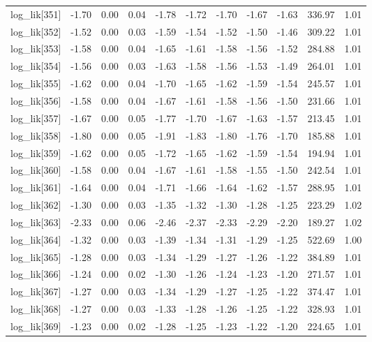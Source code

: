 \begin{table}[ht]
\begin{tabular}{rrrrrrrrrrr}
  log\_lik[351] & -1.70 & 0.00 & 0.04 & -1.78 & -1.72 & -1.70 & -1.67 & -1.63 & 336.97 & 1.01 \\ 
  log\_lik[352] & -1.52 & 0.00 & 0.03 & -1.59 & -1.54 & -1.52 & -1.50 & -1.46 & 309.22 & 1.01 \\ 
  log\_lik[353] & -1.58 & 0.00 & 0.04 & -1.65 & -1.61 & -1.58 & -1.56 & -1.52 & 284.88 & 1.01 \\ 
  log\_lik[354] & -1.56 & 0.00 & 0.03 & -1.63 & -1.58 & -1.56 & -1.53 & -1.49 & 264.01 & 1.01 \\ 
  log\_lik[355] & -1.62 & 0.00 & 0.04 & -1.70 & -1.65 & -1.62 & -1.59 & -1.54 & 245.57 & 1.01 \\ 
  log\_lik[356] & -1.58 & 0.00 & 0.04 & -1.67 & -1.61 & -1.58 & -1.56 & -1.50 & 231.66 & 1.01 \\ 
  log\_lik[357] & -1.67 & 0.00 & 0.05 & -1.77 & -1.70 & -1.67 & -1.63 & -1.57 & 213.45 & 1.01 \\ 
  log\_lik[358] & -1.80 & 0.00 & 0.05 & -1.91 & -1.83 & -1.80 & -1.76 & -1.70 & 185.88 & 1.01 \\ 
  log\_lik[359] & -1.62 & 0.00 & 0.05 & -1.72 & -1.65 & -1.62 & -1.59 & -1.54 & 194.94 & 1.01 \\ 
  log\_lik[360] & -1.58 & 0.00 & 0.04 & -1.67 & -1.61 & -1.58 & -1.55 & -1.50 & 242.54 & 1.01 \\ 
  log\_lik[361] & -1.64 & 0.00 & 0.04 & -1.71 & -1.66 & -1.64 & -1.62 & -1.57 & 288.95 & 1.01 \\ 
  log\_lik[362] & -1.30 & 0.00 & 0.03 & -1.35 & -1.32 & -1.30 & -1.28 & -1.25 & 223.29 & 1.02 \\ 
  log\_lik[363] & -2.33 & 0.00 & 0.06 & -2.46 & -2.37 & -2.33 & -2.29 & -2.20 & 189.27 & 1.02 \\ 
  log\_lik[364] & -1.32 & 0.00 & 0.03 & -1.39 & -1.34 & -1.31 & -1.29 & -1.25 & 522.69 & 1.00 \\ 
  log\_lik[365] & -1.28 & 0.00 & 0.03 & -1.34 & -1.29 & -1.27 & -1.26 & -1.22 & 384.89 & 1.01 \\ 
  log\_lik[366] & -1.24 & 0.00 & 0.02 & -1.30 & -1.26 & -1.24 & -1.23 & -1.20 & 271.57 & 1.01 \\ 
  log\_lik[367] & -1.27 & 0.00 & 0.03 & -1.34 & -1.29 & -1.27 & -1.25 & -1.22 & 374.47 & 1.01 \\ 
  log\_lik[368] & -1.27 & 0.00 & 0.03 & -1.33 & -1.28 & -1.26 & -1.25 & -1.22 & 328.93 & 1.01 \\ 
  log\_lik[369] & -1.23 & 0.00 & 0.02 & -1.28 & -1.25 & -1.23 & -1.22 & -1.20 & 224.65 & 1.01 \\ 

\end{tabular}
\end{table}
